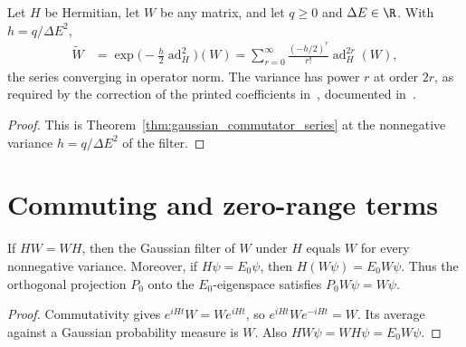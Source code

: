 \begin{theorem}
    \label{thm:hastings_gaussian_commutator_series}
    \leanok
    Let $H$ be Hermitian, let $W$ be any matrix, and let $q\ge0$ and
    $\Delta E\in\R$. With $h=q/\Delta E^2$,
    \begin{align}
        \widetilde W
         & =\exp\bigl(-\tfrac h2\operatorname{ad}_H^2\bigr)(W)
        =\sum_{r=0}^{\infty}\frac{(-h/2)^r}{r!}\operatorname{ad}_H^{2r}(W),
    \end{align}
    the series converging in operator norm. The variance has power $r$ at
    order $2r$, as required by the correction of the printed coefficients
    in~\cite[lines 1005--1009]{Hastings2006Solving}, documented
    in~\cite{gap:hastings05_gaussian_series_coefficients}.
\end{theorem}
\begin{proof}\leanok
    This is Theorem~\ref{thm:gaussian_commutator_series} at the nonnegative
    variance $h=q/\Delta E^2$ of the filter.
\end{proof}


\section{Commuting and zero-range terms}
\label{sec:gaussian_filtered_zero_range}

\begin{lemma}
    \label{thm:hastings_commuting_filter_exact}
    \leanok
    If $HW=WH$, then the Gaussian filter of $W$ under $H$ equals $W$ for
    every nonnegative variance. Moreover, if $H\psi=E_0\psi$, then
    $H(W\psi)=E_0W\psi$. Thus the orthogonal projection $P_0$ onto the
    $E_0$-eigenspace satisfies $P_0W\psi=W\psi$.
\end{lemma}
\begin{proof}\leanok
    Commutativity gives $e^{iHt}W=We^{iHt}$, so
    $e^{iHt}We^{-iHt}=W$. Its average against a Gaussian probability
    measure is $W$. Also $HW\psi=WH\psi=E_0W\psi$.
\end{proof}

